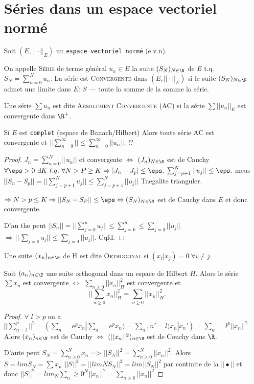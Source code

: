 \section{Séries dans un espace vectoriel normé} %

Soit $(E, ||\cdot||_E)$ un \texttt{espace vectoriel normé} (e.v.n).
\begin{definition}
	On appelle \textsc{Série} de terme général $u_n\in E$ la suite $(S_N)_{N\in \N}$ de $E$ t.q.  $S_N=\sum\limits_{n=0}^Nu_n$.
	La série est \textsc{Convergente} dans $(E, ||\cdot||_E)$ si le suite $(S_N)_{N\in\N}$ admet une limite dans $E$: $S$ --- toute la somme de la somme la série.
\end{definition}



\begin{definition}
	Une série $\sum u_n$ est dite \textsc{Absolument Convergente} (AC) si la série $\sum ||u_n||_E$ est convergente dans $\R^+$.
\end{definition}

\begin{theorem}
	Si $E$ est \texttt{complet} (espace de Banach/Hilbert) Alors toute série AC est convergente et $||\sum\limits_{n=0}^\infty||\leq \sum\limits_{n=0}^\infty||u_n||$. !?
\end{theorem}
\begin{proof}
	$J_n=\sum\limits_{n=0}^N||u_n||$ et convergente $\Leftrightarrow$ $(J_n)_{N\in\N}$ est de Cauchy $\forall \eps >0\ \exists K\ t.q.\ \forall N>P\geq K\Rightarrow |J_n-J_p|\leq \eps$. $\sum_{j=p+1}^N||u_j||\leq \eps$. meus $||S_n-S_p||=||\sum_{j=p+1}^Nu_j||\leq\sum_{j=p+1}^N ||u_j||$ Tnegalite trianguler.
	
	$\Rightarrow N>p\leq K\Rightarrow ||S_N-S_P||\leq \eps \Leftrightarrow (S_N)_{N\in \N}$ est de Cauchy dans $E$ et donc convergente.
	
	D'au the peut $||S_n||=||\sum_{j=0}^n u_j||\leq\sum_{j=0}^n\leq \sum_{j=0}||u_j||$ $\Rightarrow\ ||\sum_{j=0}u_j||\leq \sum_{j=0}||u_j||$. Cqfd.
\end{proof}

\begin{definition}
	Une suite $(x_n)_{n\in \N}$ de H est dite \textsc{Orthogonal} si $(x_i|x_j)=0\ \forall i≠j$.
\end{definition}

\begin{theorem}
	Soit $(a_n)_{n\in \Z}$ une suite orthogonal dans un espace de Hilbert $H$. Alors le série $∑x_n$ est convergente $\Longleftrightarrow$ $∑_{n≥0}||x_n||_H^2$ est convergente et \[ ||∑_{n≥0}x_n||^2_H=∑_{n≥0}||x_n||_H^2.\]
\end{theorem}
\begin{proof}
	$\forall$ $l>p$ on a $||∑_{n=l}^p||^2=(∑_n=e^p x_n | ∑_n=e^p x_n)=∑_n,n'=l(x_n|x_n')=∑_n=l^p||x_n||^2$ Alors $(x_n)_{n\in \N}$ est de Cauchy $\Leftrightarrow$ $(||x_n||^2)_{n\in \N}$ est de Couchy dans $\R$.

D'aute peut $S_N=∑_{n≥0}^N x_n$ => $||S_N||^2=∑_{n≥0}^N||x_n||^2$.
Alors $S=lim S_N=∑x_n$ $||S||^2=||lim N S_N||^2=lim ||S_N||^2$ par continite de la $||•||$ et donc $||S||^2=lim_N∑_n≥0^N||x_n||^2=∑_{n≥0}||x_n||^2$
\end{proof}

